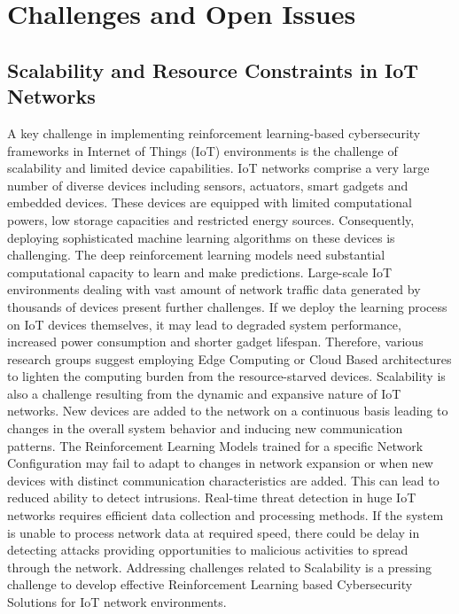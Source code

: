 \documentclass[12pt]{article}
\begin{document}
	\section{Challenges and Open Issues}
	\subsection{Scalability and Resource Constraints in IoT Networks}
    A key challenge in implementing reinforcement learning-based cybersecurity frameworks in Internet of Things (IoT) environments is the challenge of scalability and limited device capabilities. IoT networks comprise a very large number of diverse devices including sensors, actuators, smart gadgets and embedded devices. These devices are equipped with limited computational powers, low storage capacities and restricted energy sources. Consequently, deploying sophisticated machine learning algorithms on these devices is challenging.
The deep reinforcement learning models need substantial computational capacity to learn and make predictions. Large-scale IoT environments dealing with vast amount of network traffic data generated by thousands of devices present further challenges. If we deploy the learning process on IoT devices themselves, it may lead to degraded system performance, increased power consumption and shorter gadget lifespan. Therefore, various research groups suggest employing Edge Computing or Cloud Based architectures to lighten the computing burden from the resource-starved devices. 
Scalability is also a challenge resulting from the dynamic and expansive nature of IoT networks. New devices are added to the network on a continuous basis leading to changes in the overall system behavior and inducing new communication patterns. The Reinforcement Learning Models trained for a specific Network Configuration may fail to adapt to changes in network expansion or when new devices with distinct communication characteristics are added. This can lead to reduced ability to detect intrusions. 
Real-time threat detection in huge IoT networks requires efficient data collection and processing methods. If the system is unable to process network data at required speed, there could be delay in detecting attacks providing opportunities to malicious activities to spread through the network. Addressing challenges related to Scalability is a pressing challenge to develop effective Reinforcement Learning based Cybersecurity Solutions for IoT network environments.\cite{Nguyen2023, Li2024, Palmer2024}
\end{document}
